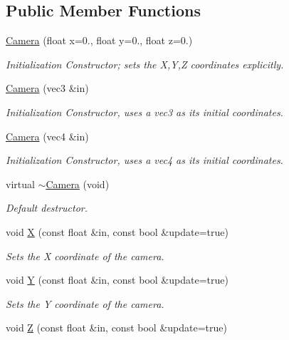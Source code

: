 \subsection*{\-Public \-Member \-Functions}
\begin{DoxyCompactItemize}
\item 
\hyperlink{class_camera_a47104bf17f448c97bf7bb34360ab8fcc}{\-Camera} (float x=0., float y=0., float z=0.)
\begin{DoxyCompactList}\small\item\em \-Initialization \-Constructor; sets the \-X,\-Y,\-Z coordinates explicitly. \end{DoxyCompactList}\item 
\hyperlink{class_camera_a388c39247312dc6850b2d1b007efb423}{\-Camera} (vec3 \&in)
\begin{DoxyCompactList}\small\item\em \-Initialization \-Constructor, uses a vec3 as its initial coordinates. \end{DoxyCompactList}\item 
\hyperlink{class_camera_a30b637b0e81821106c16a8a299d24d3f}{\-Camera} (vec4 \&in)
\begin{DoxyCompactList}\small\item\em \-Initialization \-Constructor, uses a vec4 as its initial coordinates. \end{DoxyCompactList}\item 
virtual \hyperlink{class_camera_a06211f202c145b3ec8253f96e1e654a6}{$\sim$\-Camera} (void)
\begin{DoxyCompactList}\small\item\em \-Default destructor. \end{DoxyCompactList}\item 
void \hyperlink{class_camera_a7ff7cf14bee873ac6cda7b2e42a60358}{\-X} (const float \&in, const bool \&update=true)
\begin{DoxyCompactList}\small\item\em \-Sets the \-X coordinate of the camera. \end{DoxyCompactList}\item 
void \hyperlink{class_camera_a69af560bb7f85db3a5062d1a6b3927bf}{\-Y} (const float \&in, const bool \&update=true)
\begin{DoxyCompactList}\small\item\em \-Sets the \-Y coordinate of the camera. \end{DoxyCompactList}\item 
void \hyperlink{class_camera_a38438f8e2417a3a40eaad85d2ab344a9}{\-Z} (const float \&in, const bool \&update=true)

\end{DoxyCompactItemize}
